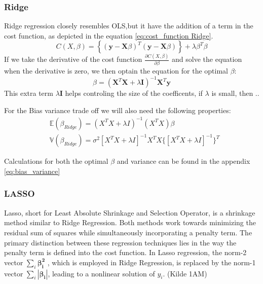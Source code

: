 \subsubsection{Ridge}
\noindent Ridge regression closely resembles OLS,but it have the addition of a term in the 
cost function, as depicted in the equation \ref{eq:cost_function Ridge}.
\begin{equation}\label{eq:cost_function Ridge}
    C(X,\beta) =  \left\lbrace ( \textbf{y} - \textbf{X}\beta )^T (\textbf{y} - \textbf{X}\beta)\right\rbrace + \lambda \beta^T \beta
\end{equation}
If we take the derivative of the cost function $\frac{\partial C(X, \beta)}{\partial \beta}$ and 
solve the equation when the derivative is zero, we then optain the equation for the optimal $\beta$:
\begin{equation}\label{eq:beta_ridge}
    \beta = (\textbf{X}^T \textbf{X} + \lambda \textbf{I})^{-1}\textbf{X}^T \textbf{y} 
\end{equation}
This extra term $\lambda \textbf{I}$ helps controling the size of the coefficents, if $\lambda$ is 
small, then ..

For the Bias variance trade off we will also need the following properties:
\begin{align}
    & \mathbb{E}(\beta_{Ridge}) = (X^T X + \lambda I )^{-1}(X^T X)\beta\\
    & \mathbb{V}(\beta_{Ridge}) = \sigma^2[X^T X + \lambda I]^{-1} X^T X \{[X^T X + \lambda I]^{-1}\}^T
\end{align}

Calculations for both the optimal $\beta$ and variance can be found in the appendix \ref{eq:bias_variance}

\subsubsection{LASSO}

\noindent Lasso, short for Least Absolute Shrinkage and Selection Operator, is a shrinkage method similar to Ridge Regression. Both
methods work towards minimizing the residual sum of squares while simultaneously incorporating a penalty term. The primary distinction
between these regression techniques lies in the way the penalty term is defined into the cost function.
\noindent In Lasso regression, the norm-2 vector $\sum_{i} \boldsymbol{\beta_i^2}$ , which is employed in Ridge Regression, is replaced by
the norm-1 vector $\sum_{i} 
|\boldsymbol{\beta_i}|$, leading to a nonlinear solution of $y_i$. (Kilde 1AM)

